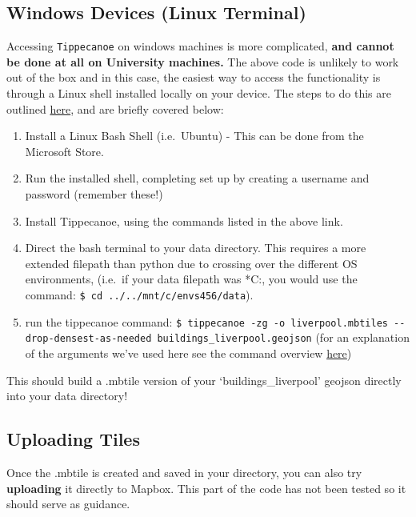 \documentclass[
  letterpaper,
  DIV=11,
  numbers=noendperiod]{scrreprt}
\providecommand{\tightlist}{%
  \setlength{\itemsep}{0pt}\setlength{\parskip}{0pt}}\usepackage{longtable,booktabs,array}
\begin{document}
\subsection{Windows Devices (Linux
Terminal)}\label{windows-devices-linux-terminal}

Accessing \texttt{Tippecanoe} on windows machines is more complicated,
\textbf{and cannot be done at all on University machines.} The above
code is unlikely to work out of the box and in this case, the easiest
way to access the functionality is through a Linux shell installed
locally on your device. The steps to do this are outlined
\href{https://gist.github.com/ryanbaumann/e5c7d76f6eeb8598e66c5785b677726e}{here},
and are briefly covered below:

\begin{enumerate}
\def\labelenumi{\arabic{enumi}.}
\tightlist
\item
  Install a Linux Bash Shell (i.e.~Ubuntu) - This can be done from the
  Microsoft Store.
\item
  Run the installed shell, completing set up by creating a username and
  password (remember these!)
\item
  Install Tippecanoe, using the commands listed in the above link.
\item
  Direct the bash terminal to your data directory. This requires a more
  extended filepath than python due to crossing over the different OS
  environments, (i.e.~if your data filepath was *C:\data*, you
  would use the command: \texttt{\$\ cd\ ../../mnt/c/envs456/data}).
\item
  run the tippecanoe command:
  \texttt{\$\ tippecanoe\ -zg\ -o\ liverpool.mbtiles\ -\/-drop-densest-as-needed\ buildings\_liverpool.geojson}
  (for an explanation of the arguments we've used here see the command
  overview
  \href{https://github.com/mapbox/tippecanoe?tab=readme-ov-file\#try-this-first}{here})
\end{enumerate}

This should build a .mbtile version of your `buildings\_liverpool'
geojson directly into your data directory!

\subsection{Uploading Tiles}\label{uploading-tiles}

Once the .mbtile is created and saved in your directory, you can also
try \textbf{uploading} it directly to Mapbox. This part of the code has
not been tested so it should serve as guidance.
\end{document}
